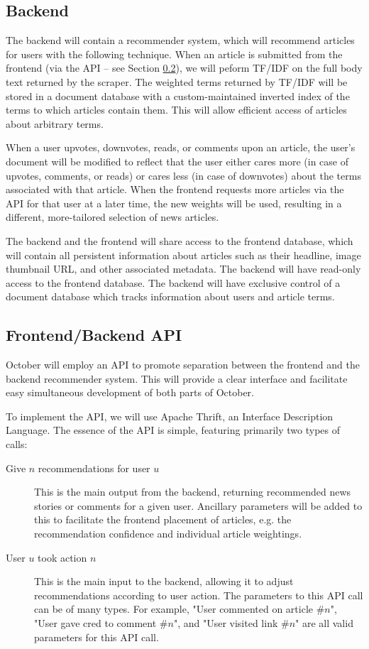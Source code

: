 \documentclass[11pt,letterpaper]{article}
\begin{document}
\subsection{Backend}
The backend will contain a recommender system, which will recommend articles for users with the following technique.
When an article is submitted from the frontend (via the API -- see Section \ref{sec:api}), we will peform TF/IDF\cite{tfidf} on the full body text returned by the scraper.
The weighted terms returned by TF/IDF will be stored in a document database with a custom-maintained inverted index of the terms to which articles contain them.
This will allow efficient access of articles about arbitrary terms.

When a user upvotes, downvotes, reads, or comments upon an article, the user's document will be modified to reflect that the user either cares more (in case of upvotes, comments, or reads) or cares less (in case of downvotes) about the terms associated with that article.
When the frontend requests more articles via the API for that user at a later time, the new weights will be used, resulting in a different, more-tailored selection of news articles.

The backend and the frontend will share access to the frontend database, which will contain all persistent information about articles such as their headline, image thumbnail URL, and other associated metadata.
The backend will have read-only access to the frontend database.
The backend will have exclusive control of a document database which tracks information about users and article terms.

\subsection{Frontend/Backend API}
\label{sec:api}
October will employ an API to promote separation between the frontend and the backend recommender system.
This will provide a clear interface and facilitate easy simultaneous development of both parts of October.

To implement the API, we will use Apache Thrift, an Interface Description Language\cite{thrift}.
The essence of the API is simple, featuring primarily two types of calls:
\begin{description}
\item[Give $n$ recommendations for user $u$]
This is the main output from the backend, returning recommended news stories or comments for a given user.
Ancillary parameters will be added to this to facilitate the frontend placement of articles, e.g. the recommendation confidence and individual article weightings.
\item[User $u$ took action $n$]
This is the main input to the backend, allowing it to adjust recommendations according to user action.
The parameters to this API call can be of many types. For example, "User commented on article \#$n$", "User gave cred to comment \#$n$", and "User visited link \#$n$" are all valid parameters for this API call.
\end{description}
\end{document}
